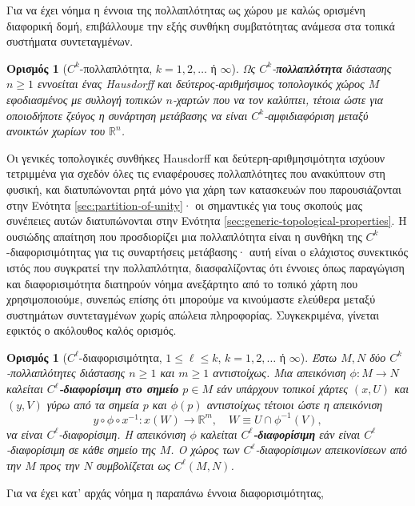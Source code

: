 \documentclass[11pt,a4paper,twoside,openright]{book}
\newtheorem{definition}[lemma]{Ορισμός}
\begin{document}
Για να έχει νόημα η έννοια της πολλαπλότητας ως χώρου
με καλώς ορισμένη διαφορική δομή,
επιβάλλουμε την εξής συνθήκη συμβατότητας
ανάμεσα στα τοπικά συστήματα συντεταγμένων.
\begin{definition}[$C^k$-πολλαπλότητα, $k = 1, 2, \dots$ ή $\infty$]\label{def:manifold}
Ως $C^k$-\textbf{πολλαπλότητα} διάστασης $n \ge 1$
εννοείται ένας Hausdorff και δεύτερος-αριθμήσιμος τοπολογικός χώρος $M$ εφοδιασμένος με συλλογή τοπικών
$n$-χαρτών που να τον καλύπτει, τέτοια ώστε
για οποιοδήποτε ζεύγος
η συνάρτηση μετάβασης να είναι $C^k$-αμφιδιαφόριση
μεταξύ ανοικτών χωρίων του $\mathbb{R}^n$.
\end{definition}
\noindent
Οι γενικές τοπολογικές συνθήκες Hausdorff και δεύτερη-αριθμησιμότητα ισχύουν τετριμμένα για σχεδόν όλες τις ενιαφέρουσες πολλαπλότητες που ανακύπτουν στη φυσική, και διατυπώνονται ρητά μόνο για χάρη των κατασκευών που παρουσιάζονται στην Eνότητα \ref{sec:partition-of-unity}· οι σημαντικές για τους σκοπούς μας συνέπειες αυτών διατυπώνονται στην Ενότητα \ref{sec:generic-topological-properties}. Η ουσιώδης απαίτηση που προσδιορίζει μια πολλαπλότητα είναι η συνθήκη της $C^k$-διαφορισιμότητας για τις συναρτήσεις μετάβασης·
αυτή είναι ο ελάχιστος συνεκτικός ιστός που συγκρατεί την πολλαπλότητα, διασφαλίζοντας ότι έννοιες όπως παραγώγιση και διαφορισιμότητα διατηρούν νόημα ανεξάρτητο από το τοπικό χάρτη που χρησιμοποιούμε, συνεπώς
επίσης ότι μπορούμε να κινούμαστε ελεύθερα
μεταξύ συστημάτων συντεταγμένων χωρίς απώλεια πληροφορίας.
Συγκεκριμένα, γίνεται εφικτός ο ακόλουθος καλός ορισμός.
\begin{definition}[$C^\ell$-διαφορισιμότητα, $1 \le \ell \le k$, $k = 1, 2, \dots$ ή $\infty$]\label{def:differentiability}
Έστω $M, N$ δύο $C^k$-πολλαπλότητες διάστασης $n \ge 1$ και $m \ge 1$ αντιστοίχως.
Μια απεικόνιση $\phi: M \to N$ καλείται \textbf{$C^\ell$-διαφορίσιμη στο σημείο} $p \in M$ εάν υπάρχουν
τοπικοί χάρτες $(x, U)$ και $(y, V)$
γύρω από τα σημεία $p$ και $\phi(p)$ αντιστοίχως τέτοιοι ώστε
η απεικόνιση
\begin{equation*}
y \circ \phi \circ x^{-1}: x(W) \to \mathbb{R}^m,
\quad W \equiv U \cap \phi^{-1}(V),
\end{equation*}
να είναι $C^\ell$-διαφορίσιμη.
Η απεικόνιση $\phi$ καλείται \textbf{$C^\ell$-διαφορίσιμη} εάν είναι $C^\ell$-διαφορίσιμη σε κάθε σημείο της $M$. Ο χώρος των $C^\ell$-διαφορίσιμων απεικονίσεων από την $Μ$ προς την $Ν$
συμβολίζεται ως $C^\ell(M, N)$.
\end{definition}
\noindent
Για να έχει κατ' αρχάς νόημα η παραπάνω έννοια διαφορισιμότητας,
\end{document}
